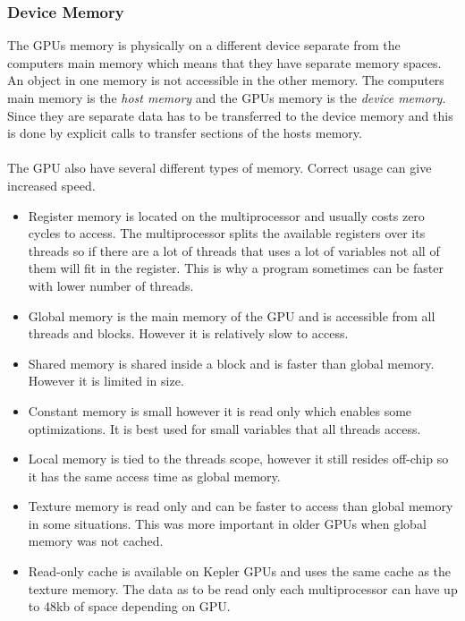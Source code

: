 \documentclass[10pt,a4paper]{report}
\begin{document}
\subsubsection{Device Memory}
The GPUs memory is physically on a different device separate from the computers main memory which means that they have separate memory spaces. An object in one memory is not accessible in the other memory. The computers main memory is the \emph{host memory} and the GPUs memory is the \emph{device memory}. Since they are separate data has to be transferred to the device memory and this is done by explicit calls to transfer sections of the hosts memory.\cite{cuda}\\
\\
The GPU also have several different types of memory\cite{cuda}. Correct usage can give increased speed\cite{cuda, cuda_best_practice}.

\begin{itemize}
  \item Register memory is located on the multiprocessor and usually costs zero cycles to access. The multiprocessor splits the available registers over its threads so if there are a lot of threads that uses a lot of variables not all of them will fit in the register. This is why a program sometimes can be faster with lower number of threads.\cite{cuda}
  \item Global memory is the main memory of the GPU and is accessible from all threads and blocks. However it is relatively slow to access.\cite{cuda}
  \item Shared memory is shared inside a block and is faster than global memory. However it is limited in size.\cite{cuda}
  \item Constant memory is small however it is read only which enables some optimizations. It is best used for small variables that all threads access.\cite{cuda}
  \item Local memory is tied to the threads scope, however it still resides off-chip so it has the same access time as global memory.\cite{cuda}
  \item Texture memory is read only and can be faster to access than global memory in some situations. This was more important in older GPUs when global memory was not cached.\cite{plink_gpu, cuda}
  \item Read-only cache is available on Kepler GPUs and uses the same cache as the texture memory. The data as to be read only each multiprocessor can have up to 48kb of space depending on GPU.\cite{kepler_tuning_guide}
\end{itemize}
\end{document}
